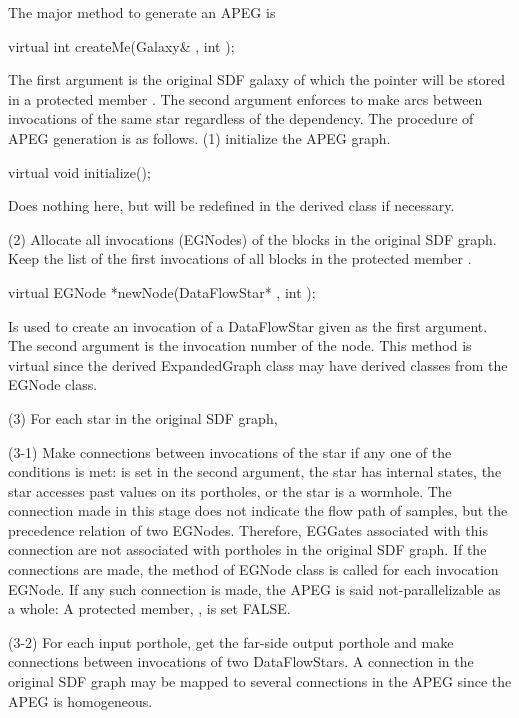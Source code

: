 The major method to generate an APEG is 

\begin{example}
virtual int createMe(Galaxy& , int );
\end{example}

The first argument is the original SDF galaxy of which the pointer will
be stored in a protected member . The second argument
enforces to make arcs between invocations of the same star regardless
of the dependency. The procedure of APEG generation is as follows.
(1) initialize the APEG graph.

\begin{example}
virtual void initialize();
\end{example}

Does nothing here, but will be redefined in the derived class if necessary.

(2) Allocate all invocations (EGNodes) of the blocks in the original SDF
graph. Keep the list of the first invocations of all blocks in the protected
member . 

\begin{example}
virtual EGNode *newNode(DataFlowStar* , int );
\end{example}

Is used to create an invocation of a DataFlowStar given as the first
argument. The second argument is the invocation number of the node.
This method is virtual since the derived ExpandedGraph class may have
derived classes from the EGNode class.

(3) For each star in the original SDF graph, 

(3-1) Make connections between invocations of the star if any one of the
conditions is met:  is set in the second argument,
the star has internal states, the star accesses past values on its
portholes, or the star is a wormhole. The connection made in this
stage does not indicate the flow path of samples, but the
precedence relation of two EGNodes. Therefore, EGGates associated
with this connection are not associated with portholes in the
original SDF graph. If the connections are made, 
the  method of EGNode class is called for each
invocation EGNode. If any such connection is made, the APEG
is said not-parallelizable as a whole: A protected member,
, is set FALSE.

(3-2) For each input porthole, get the far-side output porthole and make
connections between invocations of two DataFlowStars. A connection
in the original SDF graph may be mapped to several connections
in the APEG since the APEG is homogeneous. 

